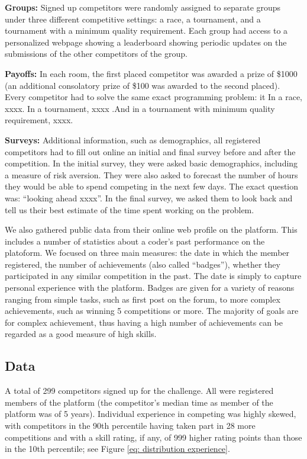 \textbf{Groups:} Signed up competitors were randomly assigned to
separate groups under three different competitive settings: a race, a
tournament, and a tournament with a minimum quality requirement. Each
group had access to a personalized webpage showing a leaderboard showing
periodic updates on the submissions of the other competitors of the
group.

\textbf{Payoffs:} In each room, the first placed competitor was awarded
a prize of \$1000 (an additional consolatory prize of \$100 was awarded
to the second placed). Every competitor had to solve the same exact
programming problem: it In a race, xxxx. In a tournament, xxxx .And in a
tournament with minimum quality requirement, xxxx.

\textbf{Surveys:} Additional information, such as demographics, all
registered competitors had to fill out online an initial and final
survey before and after the competition. In the initial survey, they
were asked basic demographics, including a measure of risk aversion.
They were also asked to forecast the number of hours they would be able
to spend competing in the next few days. The exact question was:
``looking ahead xxxx''. In the final survey, we asked them to look back
and tell us their best estimate of the time spent working on the
problem.

We also gathered public data from their online web profile on the
platform. This includes a number of statistics about a coder's past
performance on the platoform. We focused on three main measures: the
date in which the member registered, the number of achievements (also
called ``badges''), whether they participated in any similar competition
in the past. The date is simply to capture personal experience with the
platform. Badges are given for a variety of reasons ranging from simple
tasks, such as first post on the forum, to more complex achievements,
such as winning 5 competitions or more. The majority of goals are for
complex achievement, thus having a high number of achievements can be
regarded as a good measure of high skills.

\subsection{Data}\label{data}

A total of 299 competitors signed up for the challenge. All were
registered members of the platform (the competitor's median time as
member of the platform was of 5 years). Individual experience in
competing was highly skewed, with competitors in the 90th percentile
having taken part in 28 more competitions and with a skill rating, if
any, of 999 higher rating points than those in the 10th percentile; see
Figure \ref{eq: distribution experience}.

